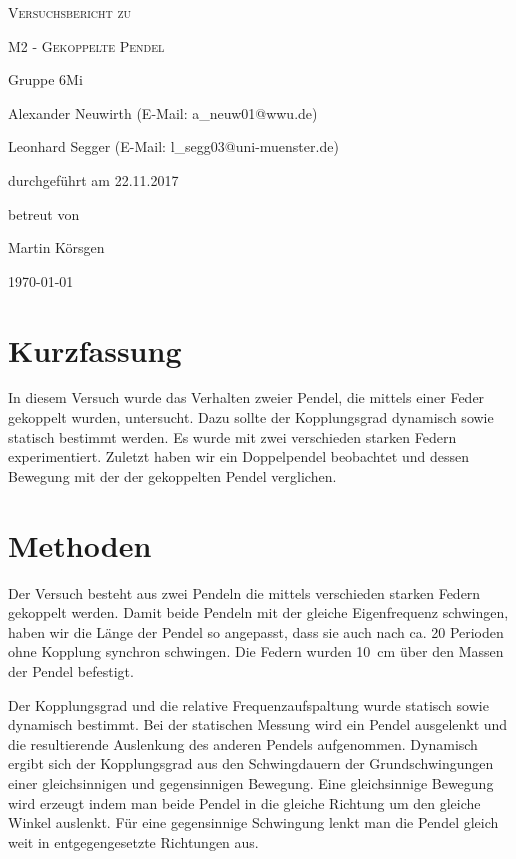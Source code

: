 \documentclass[
	a4paper,
	12pt,
	pagesize,
	ngerman
]{scrartcl}
\begin{document}
	
	\begin{titlepage}
		\centering
		{\scshape\LARGE Versuchsbericht zu \par}
		\vspace{1cm}
		{\scshape\huge M2 - Gekoppelte Pendel\par}
		\vspace{2.5cm}
		{\LARGE Gruppe 6Mi \par}
		\vspace{0.5cm}
		
		{\large Alexander Neuwirth (E-Mail: a\_neuw01@wwu.de) \par}
		{\large Leonhard Segger (E-Mail: l\_segg03@uni-muenster.de) \par}
		\vfill
		
		durchgeführt am 22.11.2017\par
		betreut von\par
		{\large Martin Körsgen}
		
		\vfill
		
		{\large \today\par}
	\end{titlepage}
	\tableofcontents
	\newpage
	
	\section{Kurzfassung}
	In diesem Versuch wurde das Verhalten zweier Pendel, die mittels einer Feder gekoppelt wurden, untersucht. Dazu sollte der Kopplungsgrad dynamisch sowie statisch bestimmt werden.
	Es wurde mit zwei verschieden starken Federn experimentiert.
	Zuletzt haben wir ein Doppelpendel beobachtet und dessen Bewegung mit der der gekoppelten Pendel verglichen.

	\section{Methoden}
	Der Versuch besteht aus zwei Pendeln die mittels verschieden starken Federn gekoppelt werden. Damit beide Pendeln mit der gleiche Eigenfrequenz schwingen, haben wir die Länge der Pendel so angepasst, dass sie auch nach ca. 20 Perioden ohne Kopplung synchron schwingen. Die Federn wurden \SI{10}{cm} über den Massen der Pendel befestigt. 
	
	Der Kopplungsgrad und die relative Frequenzaufspaltung wurde statisch sowie dynamisch bestimmt. Bei der statischen Messung wird ein Pendel ausgelenkt und die resultierende Auslenkung des anderen Pendels aufgenommen. Dynamisch ergibt sich der Kopplungsgrad aus den Schwingdauern der Grundschwingungen einer gleichsinnigen und gegensinnigen Bewegung. Eine gleichsinnige Bewegung wird erzeugt indem man beide Pendel in die gleiche Richtung um den gleiche Winkel auslenkt. Für eine gegensinnige Schwingung lenkt man die Pendel gleich weit in entgegengesetzte Richtungen aus.
	
\end{document}
